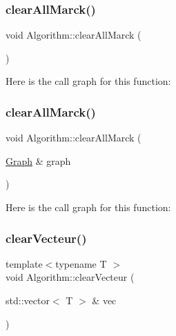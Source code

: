 \subsubsection{\texorpdfstring{clear\+All\+Marck()}{clearAllMarck()}\hspace{0.1cm}{\footnotesize\ttfamily [1/2]}}
{\footnotesize\ttfamily void Algorithm\+::clear\+All\+Marck (\begin{DoxyParamCaption}{ }\end{DoxyParamCaption})}

Here is the call graph for this function\+:
\mbox{\label{struct_algorithm_ae9a908eaca25badea660fc00644e66a3}} 
\subsubsection{\texorpdfstring{clear\+All\+Marck()}{clearAllMarck()}\hspace{0.1cm}{\footnotesize\ttfamily [2/2]}}
{\footnotesize\ttfamily void Algorithm\+::clear\+All\+Marck (\begin{DoxyParamCaption}\item[{\mbox{\hyperlink{class_graph}{Graph}} \&}]{graph }\end{DoxyParamCaption})}

Here is the call graph for this function\+:
\mbox{\label{struct_algorithm_a929117c2d005410de6883ad36330328b}} 
\subsubsection{\texorpdfstring{clear\+Vecteur()}{clearVecteur()}}
{\footnotesize\ttfamily template$<$typename T $>$ \\
void Algorithm\+::clear\+Vecteur (\begin{DoxyParamCaption}\item[{std\+::vector$<$ T $>$ \&}]{vec }\end{DoxyParamCaption})}

\mbox{\label{struct_algorithm_a471cce04cc5a3fb74800171c0de76f3d}} 
